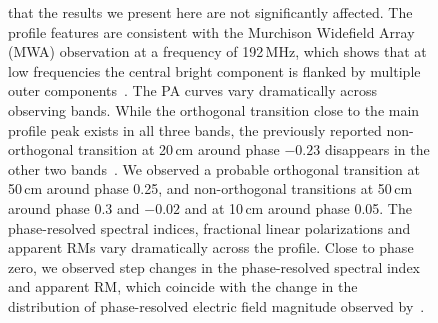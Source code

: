 \documentclass[useAMS,usenatbib]{mn2e}
\begin{document}
\begin{appendix}
\begin{figure}
\begin{center}
{that the results we present here are not significantly affected.
%
The profile features are consistent with the Murchison Widefield Array (MWA) 
observation at a frequency of 192\,MHz, which shows that at low frequencies 
the central bright component is flanked by multiple outer components~\citep{Bhat14}.
%
The PA curves vary dramatically across observing bands. While the orthogonal 
transition close to the main profile peak exists in all three bands, the previously
reported non-orthogonal transition at 20\,cm around phase $-0.23$ disappears in 
the other two bands~\citep{Yan11}.
%
We observed a probable orthogonal transition at 50\,cm around phase 0.25, and 
non-orthogonal transitions at 50\,cm around phase 0.3 and $-0.02$ and at 10\,cm 
around phase 0.05.
%
The phase-resolved spectral indices, fractional linear polarizations and apparent 
RMs vary dramatically across the profile.
%
Close to phase zero, we observed step changes in the phase-resolved spectral index and 
apparent RM, which coincide with the change in the distribution of phase-resolved electric 
field magnitude observed by~\citet{Oslowski14}.
}
\label{0437}
\end{center}
\end{figure}


\end{appendix}
\end{document}
